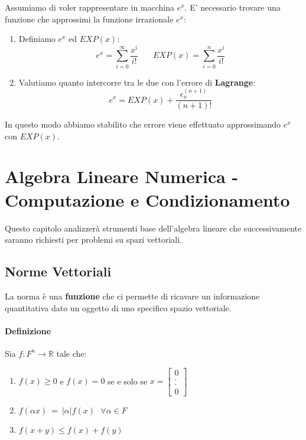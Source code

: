 \documentclass{article}
\begin{document}
Assumiamo di voler rappresentare in macchina $e^x$. E' necessario trovare una funzione che approssimi la funzione irrazionale $e^x$:

\begin{enumerate}
    \item Definiamo $e^x$ ed $EXP(x)$:
    \[ \boxed{e^{x} = \sum^{\infty}_{i=0} \frac{x^{i}}{i!}} \: \: \: \: \: \: \: \: \boxed{EXP(x) = \sum^{n}_{i=0} \frac{x^{i}}{i!}} \]
    \item Valutiamo quanto intercorre tra le due con l'errore di \textbf{Lagrange}:
    \[ e^x = EXP(x) + \frac{\epsilon^{(n+1)}_{x}}{(n+1)!} \]
\end{enumerate}

In questo modo abbiamo stabilito che errore viene effettuato approssimando $e^x$ con $EXP(x)$.

\newpage

\section{Algebra Lineare Numerica - Computazione e Condizionamento}

Questo capitolo analizzerà strumenti base dell'algebra lineare che successivamente saranno richiesti per problemi su spazi vettoriali.

\subsection{Norme Vettoriali}

La norma è una \textbf{funzione} che ci permette di ricavare un informazione quantitativa dato un oggetto di uno specifico spazio vettoriale.

\paragraph{Definizione} Sia $f: F^{n} \xrightarrow{} \mathbb{R}$ tale che:

\begin{enumerate}
    \item $f(x) \geq 0 $ e $f(x) = 0$ se e solo se $x = \begin{bmatrix}
0 \\
. \\
. \\
0
\end{bmatrix}$

    \item $f(\alpha x) \: = \: |\alpha|f(x) \: \: \: \forall \alpha \in F $
    \item $f(x+y) \leq f(x) + f(y)$
\end{enumerate}
\end{document}
